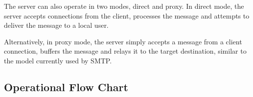 The server can also operate in two modes, direct and proxy. In direct
mode, the server accepts connections from the client, processes the
message and attempts to deliver the message to a local user.


Alternatively, in proxy mode, the server simply accepts a message from a
client connection, buffers the message and relays it to the target 
destination, similar to the model currently used by SMTP.

\subsection{Operational Flow Chart}

\todo
